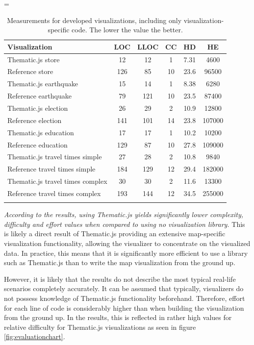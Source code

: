 \LTcapwidth=\textwidth
\begin{longtable}{|l|c|c|c|c|c|}
\hline
\textbf{Visualization} & \textbf{LOC} & \textbf{LLOC} & \textbf{CC} & \textbf{HD} & \textbf{HE} \\
\hline
\rowcolor{gray!15}
Thematic.js store & 12 & 12 & 1 & 7.31 & 4600 \\
\rowcolor{gray!15}
Reference store & 126 & 85 & 10 & 23.6 & 96500 \\
Thematic.js earthquake & 15 & 14 & 1 & 8.38 & 6280 \\
Reference earthquake & 79 & 121 & 10 & 23.5 & 87400 \\
\rowcolor{gray!15}
Thematic.js election & 26 & 29 & 2 & 10.9 & 12800 \\
\rowcolor{gray!15}
Reference election & 141 & 101 & 14 & 23.8 & 107000 \\
Thematic.js education & 17 & 17 & 1 & 10.2 & 10200 \\
Reference education & 129 & 87 & 10 & 27.8 & 109000 \\
\rowcolor{gray!15}
Thematic.js travel times simple & 27 & 28 & 2 & 10.8 & 9840 \\
\rowcolor{gray!15}
Reference travel times simple & 184 & 129 & 12 & 29.4 & 182000 \\
Thematic.js travel times complex & 30 & 30 & 2 & 11.6 & 13300 \\
Reference travel times complex & 193 & 144 & 12 & 34.5 & 255000 \\
\hline
\caption{Measurements for developed visualizations, including only visualization-specific code. The lower the value the better.}
\label{table:efficiencymetrics}
\end{longtable}

\emph{According to the results, using Thematic.js yields significantly lower complexity, difficulty and effort values when compared to using no visualization library.} This is likely a direct result of Thematic.js providing an extensive map-specific visualization functionality, allowing the visualizer to concentrate on the visualized data. In practice, this means that it is significantly more efficient to use a library such as Thematic.js than to write the map visualization from the ground up. 

However, it is likely that the results do not describe the most typical real-life scenarios completely accurately. It can be assumed that typically, visualizers do not possess knowledge of Thematic.js functionality beforehand. Therefore, effort for each line of code is considerably higher than when building the visualization from the ground up. In the results, this is reflected in rather high values for relative difficulty for Thematic.js visualizations as seen in figure \ref{fig:evaluationchart}.

